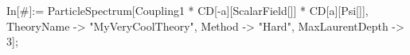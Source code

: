 In[\#]:= ParticleSpectrum[Coupling1 * CD[-a][ScalarField[]] * CD[a][Psi[]], TheoryName -> "MyVeryCoolTheory", Method -> "Hard", MaxLaurentDepth -> 3]; 